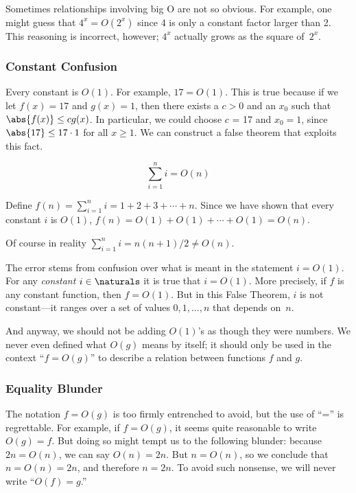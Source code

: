 Sometimes relationships involving big O are not so obvious.  For
example, one might guess that $4^x = O(2^x)$ since 4 is only a
constant factor larger than 2.  This reasoning is incorrect, however;
$4^x$ actually grows as the square of~$2^x$.

\subsubsection{Constant Confusion}

Every constant is $O(1)$.  For example, $17 = O(1)$.  This is true because
if we let $f(x) = 17$ and $g(x) = 1$, then there exists a $c > 0$ and an
$x_0$ such that $\abs{f(x)} \leq c g(x)$.  In particular, we could choose
$c$ = 17 and $x_0 = 1$, since $\abs{17} \leq 17 \cdot 1$ for all $x \geq
1$.  We can construct a false theorem that exploits this fact.

\begin{falsethm}
\[
\sum_{i=1}^n i = O(n)
\]
\end{falsethm}

\begin{bogusproof}
Define $f(n) = \sum_{i=1}^n i = 1 + 2 + 3 + \cdots + n$.  Since we
have shown that every constant $i$ is $O(1)$, $f(n) = O(1) + O(1) +
\cdots + O(1) = O(n)$.
\end{bogusproof}

Of course in reality $\sum_{i=1}^n i = n(n+1)/2 \neq O(n)$.

The error stems from confusion over what is meant in the statement $i
= O(1)$.  For any \emph{constant} $i\in \naturals$ it is true that $i
= O(1)$.  More precisely, if $f$ is any constant function, then $f =
O(1)$.  But in this False Theorem, $i$ is not constant---it ranges
over a set of values $0, 1,\dots, n$ that depends on~$n$.

And anyway, we should not be adding $O(1)$'s as though they were numbers.
We never even defined what $O(g)$ means by itself; it should only be used
in the context ``$f = O(g)$'' to describe a relation between functions $f$
and $g$.

\subsubsection{Equality Blunder}

The notation $f = O(g)$ is too firmly entrenched to avoid, but the use of
``='' is regrettable.  For example, if $f = O(g)$, it seems quite
reasonable to write $O(g) = f$.  But doing so might tempt us to the
following blunder: because $2n = O(n)$, we can say $O(n) = 2n$.  But $n =
O(n)$, so we conclude that $n = O(n) = 2n$, and therefore $n = 2n$.  To
avoid such nonsense, we will never write ``$O(f) = g$.''


